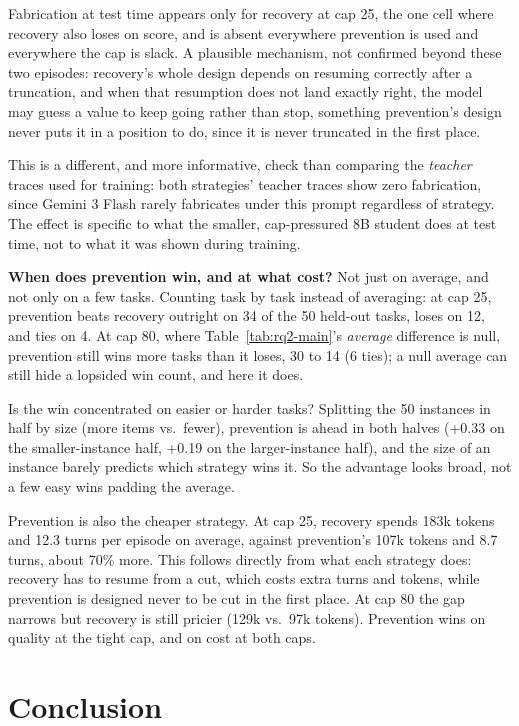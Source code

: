 \documentclass[11pt,a4paper]{article}
\begin{document}
Fabrication at test time appears only for recovery at cap 25, the one cell where recovery
also loses on score, and is absent everywhere prevention is used and everywhere the cap is
slack. A plausible mechanism, not confirmed beyond these two episodes: recovery's whole design
depends on resuming correctly after a truncation, and when that resumption does not land
exactly right, the model may guess a value to keep going rather than stop, something
prevention's design never puts it in a position to do, since it is never truncated in the first
place.

This is a different, and more informative, check than comparing the \emph{teacher} traces used
for training: both strategies' teacher traces show zero fabrication, since Gemini 3 Flash rarely
fabricates under this prompt regardless of strategy. The effect is specific to what the smaller,
cap-pressured 8B student does at test time, not to what it was shown during training.

\textbf{When does prevention win, and at what cost?} Not just on average, and not only on a few
tasks. Counting task by task instead of averaging: at cap 25, prevention beats recovery outright
on 34 of the 50 held-out tasks, loses on 12, and ties on 4. At cap 80, where
Table~\ref{tab:rq2-main}'s \emph{average} difference is null, prevention still wins more tasks
than it loses, 30 to 14 (6 ties); a null average can still hide a lopsided win count, and here it
does.

Is the win concentrated on easier or harder tasks? Splitting the 50 instances in half by size
(more items vs.\ fewer), prevention is ahead in both halves (+0.33 on the smaller-instance half,
+0.19 on the larger-instance half), and the size of an instance barely predicts which strategy
wins it. So the advantage looks broad, not a few easy wins padding the average.

Prevention is also the cheaper strategy. At cap 25, recovery spends 183k tokens and 12.3 turns
per episode on average, against prevention's 107k tokens and 8.7 turns, about 70\% more. This
follows directly from what each strategy does: recovery has to resume from a cut, which costs
extra turns and tokens, while prevention is designed never to be cut in the first place. At cap
80 the gap narrows but recovery is still pricier (129k vs.\ 97k tokens). Prevention wins on
quality at the tight cap, and on cost at both caps.

\section{Conclusion}
\label{sec:conclusion}
\end{document}

